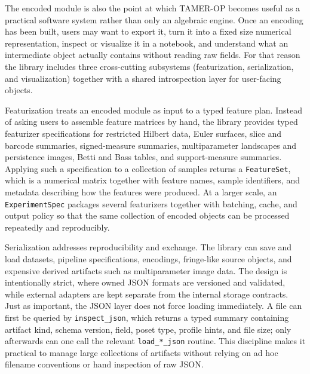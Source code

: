 \documentclass[11pt]{article}
\newcommand{\TAMER}{\textsc{TAMER-OP}}
\theoremstyle{definition}
\theoremstyle{remark}
\begin{document}
The encoded module is also the point at which \TAMER{} becomes useful as a practical software system rather than only an algebraic engine.  Once an encoding has been built, users may want to export it, turn it into a fixed size numerical representation, inspect or visualize it in a notebook, and understand what an intermediate object actually contains without reading raw fields.  For that reason the library includes three cross-cutting subsystems (featurization, serialization, and visualization) together with a shared introspection layer for user-facing objects.

Featurization treats an encoded module as input to a typed feature plan.  Instead of asking users to assemble feature matrices by hand, the library provides typed featurizer specifications for restricted Hilbert data, Euler surfaces, slice and barcode summaries, signed-measure summaries, multiparameter landscapes and persistence images, Betti and Bass tables, and support-measure summaries.  Applying such a specification to a collection of samples returns a \texttt{FeatureSet}, which is a numerical matrix together with feature names, sample identifiers, and metadata describing how the features were produced.  At a larger scale, an \texttt{ExperimentSpec} packages several featurizers together with batching, cache, and output policy so that the same collection of encoded objects can be processed repeatedly and reproducibly.

Serialization addresses reproducibility and exchange.  The library can save and load datasets, pipeline specifications, encodings, fringe-like source objects, and expensive derived artifacts such as multiparameter image data.  The design is intentionally strict, where owned JSON formats are versioned and validated, while external adapters are kept separate from the internal storage contracts.  Just as important, the JSON layer does not force loading immediately.  A file can first be queried by \texttt{inspect\_json}, which returns a typed summary containing artifact kind, schema version, field, poset type, profile hints, and file size; only afterwards can one call the relevant \texttt{load\_*\_json} routine.  This discipline makes it practical to manage large collections of artifacts without relying on ad hoc filename conventions or hand inspection of raw JSON.
\end{document}
